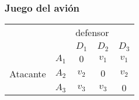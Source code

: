 \documentclass[12pt]{article}
\begin{document}
\subsubsection{Juego del avión}
    \begin{center}    
        \setlength{\extrarowheight}{0pt}
        \begin{tabular}{cc|c|c|c|}
            & \multicolumn{1}{c}{} & \multicolumn{2}{c}{defensor}\\
            & \multicolumn{1}{c}{} & \multicolumn{1}{c}{$D_1$}  & \multicolumn{1}{c}{$D_2$} & \multicolumn{1}{c}{$D_3$} \\\cline{3-5}
            & $A_1$ & $0$ & $v_1$ & $v_1$ \\\cline{3-5}
            {Atacante} & $A_2$ & $v_2$ & $0$ & $v_2$ \\\cline{3-5}
            & $A_3$ & $v_3$ & $v_3$ & $0$ \\\cline{3-5}
        \end{tabular}
    \end{center}
\end{document}
